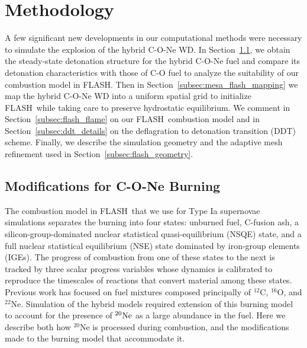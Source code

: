 \documentclass[iop,apj]{emulateapj}
\newcommand{\secref}[1]{Section~\ref{#1}}
\newcommand{\Ne}[1]{\ensuremath{{}^{#1}{\rm Ne}}}
\newcommand{\code}[1]{\textsc{#1}}
\newcommand{\FLASH}{\code{FLASH}}
\begin{document}
\section{Methodology}
A few significant new developments in our computational methods were
necessary to simulate the explosion of the hybrid C-O-Ne WD. In
\secref{subsec:one_burning_mods}, we obtain the steady-state
detonation structure for the hybrid C-O-Ne fuel and compare its
detonation characteristics with those of C-O fuel to analyze the
suitability of our combustion model in \FLASH. Then in
\secref{subsec:mesa_flash_mapping} we map the hybrid C-O-Ne WD into a
uniform spatial grid to initialize \FLASH\ while taking care to
preserve hydrostatic equilibrium. We comment in
\secref{subsec:flash_flame} on our \FLASH\ combustion model and in
\secref{subsec:ddt_details} on the deflagration to detonation
transition (DDT) scheme. Finally, we describe the simulation geometry
and the adaptive mesh refinement used in
\secref{subsec:flash_geometry}.

\subsection{Modifications for C-O-Ne Burning} 
\label{subsec:one_burning_mods}

The combustion model in \FLASH\ that we use for Type Ia supernovae
simulations \citep{Caldetal07, townsley.calder.ea:flame,
  SeitTownetal09, townetal2009, jacketal2014, townetal15} separates
the burning into four states: unburned fuel, C-fusion ash, a
silicon-group-dominated nuclear statistical quasi-equilibrium (NSQE)
state, and a full nuclear statistical equilibrium (NSE) state
dominated by iron-group elements (IGEs). The progress of combustion
from one of these states to the next is tracked by three scalar
progress variables whose dynamics is calibrated to reproduce the
timescales of reactions that convert material among these
states. Previous work has focused on fuel mixtures composed
principally of $^{12}$C, $^{16}$O, and $^{22}$Ne.  Simulation of the
hybrid models required extension of this burning model to account for
the presence of \Ne{20} as a large abundance in the fuel. Here we
describe both how $^{20}$Ne is processed during combustion, and the
modifications made to the burning model that accommodate it.
\end{document}
